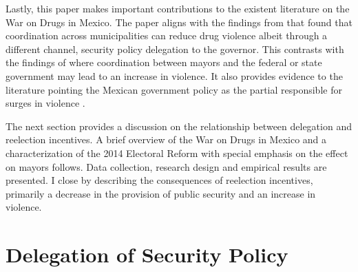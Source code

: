 Lastly, this paper makes important contributions to the existent literature on the War on Drugs in Mexico. The paper aligns with the findings from \citet{durante_gutierrez_2013} that found that coordination across municipalities can reduce drug violence albeit through a different channel, security policy delegation to the governor. This contrasts with the findings of \citet{dell_2015} where coordination between mayors and the federal or state government may lead to an increase in violence. It also provides evidence to the literature pointing the Mexican government policy as the partial responsible for surges in violence \citep{escalante_2011, guerrero_2011}.  

The next section provides a  discussion on the relationship between delegation and reelection incentives. A brief overview of the War on Drugs in Mexico and a characterization of the 2014 Electoral Reform with special emphasis on the effect on mayors follows. Data collection, research design and empirical results are presented. I close by describing the consequences of reelection incentives, primarily a decrease in the provision of public security and an increase in violence.
      
\section{Delegation of Security Policy  \label{sec:why_delegate}} %

